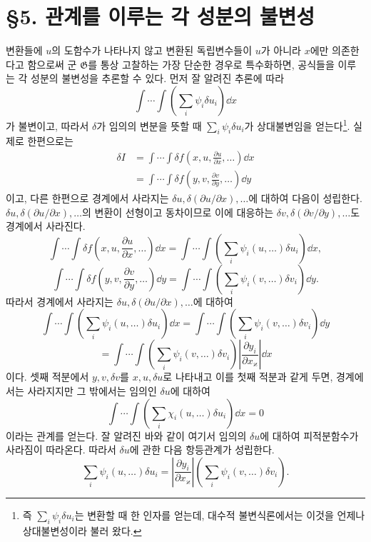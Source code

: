 \bigskip
\section*{\S{}5. 관계를 이루는 각 성분의 불변성}

변환들에 \(u\)의 도함수가 나타나지 않고 변환된 독립변수들이 \(u\)가 아니라 \(x\)에만 의존한다고 함으로써 군 \(\mathfrak G\)를 통상 고찰하는 가장 단순한 경우로 특수화하면, 공식들을 이루는 각 성분의 불변성을 추론할 수 있다. 먼저 잘 알려진 추론에 따라
\[
\int\!\cdots\!\int\left(\sum_i\psi_i\delta u_i\right)\dd x
\]
가 불변이고, 따라서 \(\delta\)가 임의의 변분을 뜻할 때 \(\sum_i\psi_i\delta u_i\)가 상대불변임을 얻는다\footnote{즉 \(\sum_i\psi_i\delta u_i\)는 변환할 때 한 인자를 얻는데, 대수적 불변식론에서는 이것을 언제나 상대불변성이라 불러 왔다.}. 실제로 한편으로는
\[
\begin{aligned}
\delta I
&=\int\!\cdots\!\int
\delta f\!\left(x,u,\frac{\partial u}{\partial x},\ldots\right)\dd x\\
&=\int\!\cdots\!\int
\delta f\!\left(y,v,\frac{\partial v}{\partial y},\ldots\right)\dd y
\end{aligned}
\]
이고, 다른 한편으로 경계에서 사라지는 \(\delta u,\delta(\partial u/\partial x),\ldots\)에 대하여 다음이 성립한다. \(\delta u,\delta(\partial u/\partial x),\ldots\)의 변환이 선형이고 동차이므로 이에 대응하는 \(\delta v,\delta(\partial v/\partial y),\ldots\)도 경계에서 사라진다.
\[
\int\!\cdots\!\int
\delta f\!\left(x,u,\frac{\partial u}{\partial x},\ldots\right)\dd x
=\int\!\cdots\!\int
\left(\sum_i\psi_i(u,\ldots)\delta u_i\right)\dd x,
\]
\[
\int\!\cdots\!\int
\delta f\!\left(y,v,\frac{\partial v}{\partial y},\ldots\right)\dd y
=\int\!\cdots\!\int
\left(\sum_i\psi_i(v,\ldots)\delta v_i\right)\dd y.
\]
따라서 경계에서 사라지는 \(\delta u,\delta(\partial u/\partial x),\ldots\)에 대하여
\[
\int\!\cdots\!\int
\left(\sum_i\psi_i(u,\ldots)\delta u_i\right)\dd x
=\int\!\cdots\!\int
\left(\sum_i\psi_i(v,\ldots)\delta v_i\right)\dd y
\]
\[
=\int\!\cdots\!\int
\left(\sum_i\psi_i(v,\ldots)\delta v_i\right)
\left|\frac{\partial y_i}{\partial x_\varkappa}\right|\dd x
\]
이다. 셋째 적분에서 \(y,v,\delta v\)를 \(x,u,\delta u\)로 나타내고 이를 첫째 적분과 같게 두면, 경계에서는 사라지지만 그 밖에서는 임의인 \(\delta u\)에 대하여
\[
\int\!\cdots\!\int
\left(\sum_i\chi_i(u,\ldots)\delta u_i\right)\dd x=0
\]
이라는 관계를 얻는다. 잘 알려진 바와 같이 여기서 임의의 \(\delta u\)에 대하여 피적분함수가 사라짐이 따라온다. 따라서 \(\delta u\)에 관한 다음 항등관계가 성립한다.
\[
\sum_i\psi_i(u,\ldots)\delta u_i
=\left|\frac{\partial y_i}{\partial x_\varkappa}\right|
\left(\sum_i\psi_i(v,\ldots)\delta v_i\right).
\]
